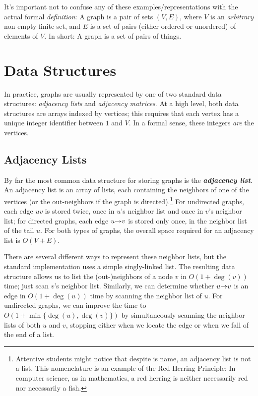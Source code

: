 It’s important not to confuse any of these examples/representations with the actual formal \textit{definition}: A graph is a pair of sets $(V, E)$, where $V$ is an \textit{arbitrary} non-empty finite set, and $E$ is a set of pairs (either ordered or unordered) of elements of $V$.
In short: A graph is a set of pairs of things.

\section{Data Structures}
\label{sec:5.4}

In practice, graphs are usually represented by one of two standard data structures: \textit{adjacency lists} and \textit{adjacency matrices}.
At a high level, both data structures are arrays indexed by vertices; this requires that each vertex has a unique integer identifier between $1$ and $V$.
In a formal sense, these integers \textit{are} the vertices.

\subsection{Adjacency Lists}

By far the most common data structure for storing graphs is the \textbf{\textit{adjacency list}}.
An adjacency list is an array of lists, each containing the neighbors of one of the vertices (or the out-neighbors if the graph is directed).\footnote{Attentive students might notice that despite is name, an adjacency list is not a list. This nomenclature is an example of the Red Herring Principle: In computer science, as in mathematics, a red herring is neither necessarily red nor necessarily a fish.}
For undirected graphs, each edge $uv$ is stored twice, once in $u$’s neighbor list and once in $v$’s neighbor list; for directed graphs, each edge $u\mathord{\rightarrow}v$ is stored only once, in the neighbor list of the tail $u$.
For both types of graphs, the overall space required for an adjacency list is $O(V + E)$.

There are several different ways to represent these neighbor lists, but the standard implementation uses a simple singly-linked list.
The resulting data structure allows us to list the (out-)neighbors of a node $v$ in $O(1 + \deg(v))$ time; just scan $v$’s neighbor list.
Similarly, we can determine whether $u\mathord{\rightarrow}v$ is an edge in $O(1 + \deg(u))$ time by scanning the neighbor list of $u$.
For undirected graphs, we can improve the time to $O(1 + \min\{\deg(u), \deg(v)\})$ by simultaneously scanning the neighbor lists of both $u$ and $v$, stopping either when we locate the edge or when we fall of the end of a list.

